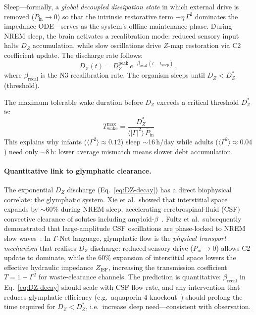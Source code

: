 \documentclass[aps,pre,twocolumn,superscriptaddress,floatfix]{revtex4-2}
\begin{document}
Sleep---formally, a \emph{global decoupled dissipation
state} in which external drive is removed
($P_{\mathrm{in}} \to 0$) so that the intrinsic
restorative term $-\eta\,\Gamma^2$ dominates the
impedance ODE---serves as the system's offline
maintenance phase.
During NREM sleep, the brain activates a recalibration
mode: reduced sensory input
halts $D_Z$ accumulation, while slow oscillations drive
$Z$-map restoration via C2 coefficient update.
The discharge rate follows:
\begin{equation}
  D_Z(t) = D_Z^{\mathrm{peak}}\,
    e^{-\beta_{\mathrm{recal}}\,(t - t_{\mathrm{sleep}})}\,,
  \label{eq:DZ-decay}
\end{equation}
where $\beta_{\mathrm{recal}}$ is the N3 recalibration rate.
The organism sleeps until $D_Z < D_Z^*$ (threshold).

The maximum tolerable wake duration before $D_Z$ exceeds
a critical threshold $D_Z^*$ is:
\begin{equation}
  \boxed{\;
  T_{\mathrm{wake}}^{\max}
    = \frac{D_Z^*}
           {\langle|\Gamma|^2\rangle\,\bar{P}_{\mathrm{in}}}
  \;}
  \label{eq:Twake}
\end{equation}
This explains why infants ($\langle\Gamma^2\rangle \approx 0.12$)
sleep $\sim$16\,h/day while adults
($\langle\Gamma^2\rangle \approx 0.04$) need only $\sim$8\,h:
lower average mismatch means slower debt accumulation.

\paragraph{Quantitative link to glymphatic clearance.}
The exponential $D_Z$ discharge (Eq.~\ref{eq:DZ-decay})
has a direct biophysical correlate: the glymphatic system.
Xie et al.\ showed that interstitial space expands by
$\sim$60\% during NREM sleep, accelerating
cerebrospinal-fluid (CSF) convective clearance of
solutes including amyloid-$\beta$~\cite{Xie2013}.
Fultz et al.\ subsequently demonstrated that large-amplitude
CSF oscillations are phase-locked to NREM slow
waves~\cite{Fultz2019}.
In $\Gamma$-Net language, glymphatic flow is the
\emph{physical transport mechanism} that
realises $D_Z$ discharge: reduced sensory drive
($P_{\mathrm{in}} \to 0$) allows C2 update
to dominate, while the 60\% expansion of
interstitial space lowers the effective hydraulic
impedance $Z_{\mathrm{ISF}}$, increasing the
transmission coefficient $T = 1 - \Gamma^2$ for
waste-clearance channels.
The prediction is quantitative:
$\beta_{\mathrm{recal}}$ in Eq.~\ref{eq:DZ-decay}
should scale with CSF flow rate, and any intervention
that reduces glymphatic efficiency (e.g.\ aquaporin-4
knockout~\cite{Nedergaard2013})
should prolong the time required for $D_Z < D_Z^*$,
i.e.\ increase sleep need---consistent with
observation.
\end{document}
